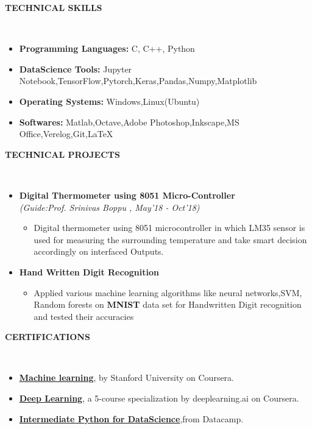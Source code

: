 \documentclass[a4paper,10pt]{article}
\newcommand{\isep}{-2 pt}
\newcommand{\lsep}{-0.5cm}
\newcommand{\resheading}[1]{{\small \colorbox{mygrey}{\begin{minipage}{0.975\textwidth}{\textbf{#1 \vphantom{p\^{E}}}}\end{minipage}}}}
\begin{document}
\resheading{\textbf{TECHNICAL SKILLS} }\\[\lsep]
\begin{itemize}
\item \noindent \textbf{Programming Languages:} C, C++, Python\item \noindent \textbf{DataScience Tools:} Jupyter Notebook,TensorFlow,Pytorch,Keras,Pandas,Numpy,Matplotlib 
\item \noindent \textbf{Operating Systems:} Windows,Linux(Ubuntu)
\item \noindent \textbf{Softwares:} Matlab,Octave,Adobe Photoshop,Inkscape,MS Office,Verelog,Git,\LaTeX{}
\end{itemize}

\resheading{\textbf{TECHNICAL PROJECTS} }\\[\lsep]
\begin{itemize}
\item \textbf{Digital Thermometer using 8051 Micro-Controller
}\\
 \emph{(Guide:Prof. Srinivas Boppu
, May'18 - Oct'18)} \\[-0.6cm]
	\begin{itemize}\itemsep \isep
	\item Digital thermometer using 8051 microcontroller in which LM35 sensor is used for measuring the surrounding temperature and take smart decision accordingly on interfaced Outputs.
	\end{itemize}

\item \textbf{Hand Written Digit Recognition} \\[\lsep]

	\begin{itemize}\itemsep \isep
	\item Applied various machine learning algorithms like neural networks,SVM, Random forests on \textbf{MNIST} data set for Handwritten Digit recognition and tested their accuracies
	\end{itemize}
\end{itemize}

\resheading{\textbf{CERTIFICATIONS} }\\[\lsep]
\begin{itemize}
\item \noindent \href{https://www.coursera.org/account/accomplishments/certificate/85J7R7652ZPA}{\textbf{Machine learning}}, by Stanford University on Coursera.
\item \noindent \href{https://www.coursera.org/account/accomplishments/specialization/certificate/DJNS8SYSQLUW}{\textbf{Deep Learning}}, a 5-course specialization by deeplearning.ai on Coursera.
\item \noindent \href{https://www.datacamp.com/statement-of-accomplishment/course/8e025414725f512e2b0fd5692a1c4d5c18fdaec7}{\textbf{Intermediate Python for DataScience}},from Datacamp.

\end{itemize}
\end{document}
